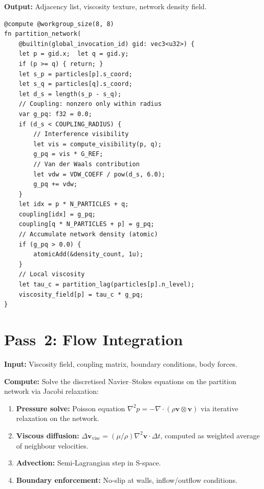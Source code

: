 \textbf{Output:} Adjacency list, viscosity texture, network density field.

\begin{lstlisting}[style=wgsl,caption={Pass 1: Partition Network (WGSL)}]
@compute @workgroup_size(8, 8)
fn partition_network(
    @builtin(global_invocation_id) gid: vec3<u32>) {
    let p = gid.x;  let q = gid.y;
    if (p >= q) { return; }
    let s_p = particles[p].s_coord;
    let s_q = particles[q].s_coord;
    let d_s = length(s_p - s_q);
    // Coupling: nonzero only within radius
    var g_pq: f32 = 0.0;
    if (d_s < COUPLING_RADIUS) {
        // Interference visibility
        let vis = compute_visibility(p, q);
        g_pq = vis * G_REF;
        // Van der Waals contribution
        let vdw = VDW_COEFF / pow(d_s, 6.0);
        g_pq += vdw;
    }
    let idx = p * N_PARTICLES + q;
    coupling[idx] = g_pq;
    coupling[q * N_PARTICLES + p] = g_pq;
    // Accumulate network density (atomic)
    if (g_pq > 0.0) {
        atomicAdd(&density_count, 1u);
    }
    // Local viscosity
    let tau_c = partition_lag(particles[p].n_level);
    viscosity_field[p] = tau_c * g_pq;
}
\end{lstlisting}

\section{Pass~2: Flow Integration}
\label{sec:pass2}

\textbf{Input:} Viscosity field, coupling matrix, boundary conditions, body forces.

\textbf{Compute:} Solve the discretised Navier--Stokes equations on the partition network via Jacobi relaxation:
\begin{enumerate}
    \item \textbf{Pressure solve:} Poisson equation $\nabla^2 p = -\nabla \cdot (\rho \mathbf{v} \otimes \mathbf{v})$ via iterative relaxation on the network.
    \item \textbf{Viscous diffusion:} $\Delta \mathbf{v}_{\mathrm{visc}} = (\mu/\rho)\nabla^2\mathbf{v} \cdot \Delta t$, computed as weighted average of neighbour velocities.
    \item \textbf{Advection:} Semi-Lagrangian step in S-space.
    \item \textbf{Boundary enforcement:} No-slip at walls, inflow/outflow conditions.
\end{enumerate}

